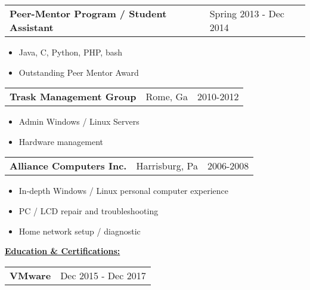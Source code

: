 \documentclass{book}
\newenvironment{myitemize}
{ \begin{itemize}
	\setlength{\itemsep}{0pt}
	\setlength{\parskip}{0pt}
	\setlength{\parsep}{0pt}     }
{ \end{itemize}                  }
\begin{document}
\begin{tabular}{L{4.75in}R{1.75in}}

	{\large {\bfseries Peer-Mentor Program / Student Assistant}} & Spring 2013 - Dec 2014 \\

\end{tabular}

	\begin{myitemize}
		\item Java, C, Python, PHP, bash
		\item Outstanding Peer Mentor Award 
	\end{myitemize} 


\begin{tabular}{L{3in}L{1.75in}R{1.75in}}

	 {\large {\bfseries Trask Management Group}} & Rome, Ga & 2010-2012 \\

\end{tabular}

\begin{myitemize}
	
	\item Admin Windows / Linux Servers

	\item Hardware management

\end{myitemize}

\begin{tabular}{L{3in}L{1.75in}R{1.75in}}

	 {\large {\bfseries Alliance Computers Inc.}} & Harrisburg, Pa & 2006-2008 \\

\end{tabular}

\begin{myitemize}
	
	\item In-depth Windows / Linux personal computer experience
	\item PC / LCD repair and troubleshooting
	\item Home network setup / diagnostic

\end{myitemize}

\underline{\Large {\bfseries Education \& Certifications:}}

\enspace

\begin{tabular}{L{4.75in}R{1.75in}}

	{\large {\bfseries VMware}} & Dec 2015 - Dec 2017 \\

\end{tabular}
\end{document}
